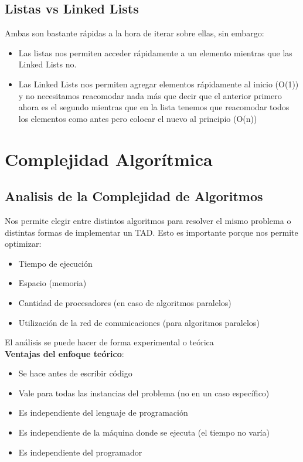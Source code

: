 \documentclass[10pt,a4paper]{article}
\begin{document}
\subsection*{Listas vs Linked Lists}
Ambas son bastante rápidas a la hora de iterar sobre ellas, sin embargo: 
\begin{itemize}
    \item Las listas nos permiten acceder rápidamente a un elemento mientras que las Linked Lists no.
    \item Las Linked Lists nos permiten agregar elementos rápidamente al inicio (O(1)) y no necesitamos reacomodar nada más que decir que el anterior primero ahora es el segundo mientras que en la lista tenemos que reacomodar todos los elementos como antes pero colocar el nuevo al principio (O(n))
\end{itemize}

\section*{Complejidad Algorítmica}
\subsection*{Analisis de la Complejidad de Algoritmos}
Nos permite elegir entre distintos algoritmos para resolver el mismo problema o distintas formas de implementar un TAD.
Esto es importante porque nos permite optimizar:
\begin{itemize}
    \item Tiempo de ejecución
    \item Espacio (memoria)
    \item Cantidad de procesadores (en caso de algoritmos paralelos)
    \item Utilización de la red de comunicaciones (para algoritmos paralelos)
\end{itemize}

El análisis se puede hacer de forma experimental o teórica \\

\textbf{Ventajas del enfoque teórico}:
\begin{itemize}
    \item Se hace antes de escribir código
    \item Vale para todas las instancias del problema (no en un caso específico)
    \item Es independiente del lenguaje de programación
    \item Es independiente de la máquina donde se ejecuta (el tiempo no varía)
    \item Es independiente del programador
\end{itemize}
\end{document}
